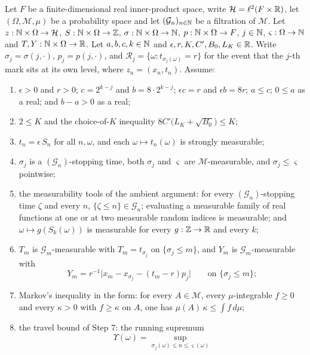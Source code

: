 \begin{lemma}
Let $F$ be a finite-dimensional real inner-product space, write
$\mathcal H=\ell^2(F\times\mathbb{R})$, let $(\Omega,\mathcal M,\mu)$ be a probability space
and let $(\mathcal G_n)_{n\in\mathbb{N}}$ be a filtration of $\mathcal M$. Let
$z:\mathbb{N}\times\Omega\to\mathcal H$, $S:\mathbb{N}\times\Omega\to\mathbb{Z}$,
$\sigma:\mathbb{N}\times\Omega\to\mathbb{N}$,
$p:\mathbb{N}\times\Omega\to F$, $j\in\mathbb{N}$, $\varsigma:\Omega\to\mathbb{N}$ and
$T,Y:\mathbb{N}\times\Omega\to\mathbb{R}$. Let $a,b,c,k\in\mathbb{N}$ and
$\epsilon,r,K,C',B_0,L_K\in\mathbb{R}$. Write $\sigma_j=\sigma(j,\cdot)$,
$p_j=p(j,\cdot)$, and $\mathcal R_j=\{\omega:t_{\sigma_j(\omega)}=r\}$ for the
event that the $j$-th mark sits at its own level, where $z_n=(x_n,t_n)$.
Assume:
\begin{enumerate}
\item\label{it:mcp-eps} $\epsilon>0$ and $r>0$; $c=2^{k-j}$ and $b=8\cdot2^{k-j}$;
$\epsilon c=r$ and $\epsilon b=8r$; $a\le c$; $0\le a$ as a real; and
$b-a>0$ as a real;
\item\label{it:mcp-K} $2\le K$ and the choice-of-$K$ inequality
$8C'\bigl(L_K+\sqrt{B_0}\bigr)\le K$;
\item\label{it:mcp-lat} $t_n=\epsilon\,S_n$ for all $n,\omega$, and each
$\omega\mapsto t_n(\omega)$ is strongly measurable;
\item\label{it:mcp-st} $\sigma_j$ is a $(\mathcal G_n)$-stopping time, both
$\sigma_j$ and $\varsigma$ are $\mathcal M$-measurable, and
$\sigma_j\le\varsigma$ pointwise;
\item\label{it:mcp-tools} the measurability tools of the ambient argument: for
every $(\mathcal G_n)$-stopping time $\zeta$ and every $n$,
$\{\zeta\le n\}\in\mathcal G_n$; evaluating a measurable family of real
functions at one or at two measurable random indices is measurable; and
$\omega\mapsto g(S_k(\omega))$ is measurable for every $g:\mathbb{Z}\to\mathbb{R}$ and every
$k$;
\item\label{it:mcp-TY} $T_m$ is $\mathcal G_m$-measurable with
$T_m=t_{\sigma_j}$ on $\{\sigma_j\le m\}$, and $Y_m$ is
$\mathcal G_m$-measurable with
\[
  Y_m=r^{-1}\bigl|x_m-x_{\sigma_j}-(t_m-r)p_j\bigr|
  \qquad\text{on }\{\sigma_j\le m\};
\]
\item\label{it:mcp-markov} Markov's inequality in the form: for every
$A\in\mathcal M$, every $\mu$-integrable $f\ge0$ and every $\kappa>0$ with
$f\ge\kappa$ on $A$, one has $\mu(A)\,\kappa\le\int f\,d\mu$;
\item\label{it:mcp-trav} the travel bound of Step 7: the running supremum
\[
  \Upsilon(\omega)=\sup_{\sigma_j(\omega)\le n\le\varsigma(\omega)}
\]
\end{enumerate}
\end{lemma}

